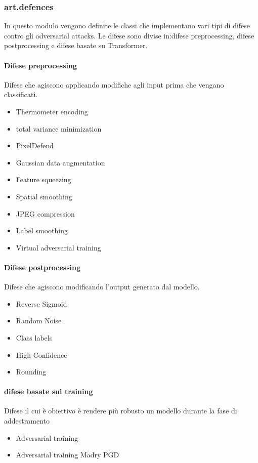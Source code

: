 \subsubsection{art.defences}
In questo modulo vengono definite le classi che implementano vari tipi di difese contro gli adversarial attacks. Le difese sono divise in:difese preprocessing, difese postprocessing
e difese basate su Transformer.

\paragraph{Difese preprocessing}
Difese che agiscono applicando modifiche agli input prima che vengano classificati.
     \begin{itemize}
        \item Thermometer encoding
        \item total variance minimization
        \item PixelDefend
        \item Gaussian data augmentation
        \item Feature squeezing
        \item Spatial smoothing
        \item JPEG compression
        \item Label smoothing
        \item Virtual adversarial training
    \end{itemize}

\paragraph{Difese postprocessing}
Difese che agiscono modificando l'output generato dal modello.
\begin{itemize}
        \item Reverse Sigmoid
        \item Random Noise 
        \item Class labels
        \item High Confidence
        \item Rounding
    \end{itemize}
\paragraph{difese basate sul training}
Difese il cui è obiettivo è rendere più robusto un modello durante la fase di addestramento
 \begin{itemize}
        \item Adversarial training
        \item Adversarial training Madry PGD
\end{itemize}
